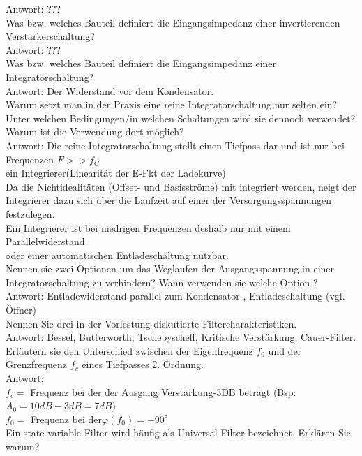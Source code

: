 \documentclass[A4]{scrartcl}
\begin{document}
  \bigskip Antwort: ???\\
  Was bzw. welches Bauteil definiert die Eingangsimpedanz einer invertierenden Verstärkerschaltung?\\
  \bigskip Antwort: ???\\
  Was bzw. welches Bauteil definiert die Eingangsimpedanz einer Integratorschaltung?\\
  \bigskip Antwort: Der Widerstand vor dem Kondensator.\\
  Warum setzt man in der Praxis eine reine Integratorschaltung nur selten ein? Unter welchen Bedingungen/in welchen Schaltungen wird sie dennoch verwendet? 
  Warum ist die Verwendung dort möglich?\\
  Antwort: Die reine Integratorschaltung stellt einen Tiefpass dar und ist nur bei Frequenzen $F >> f_C$\\
  ein Integrierer(Linearität der E-Fkt der Ladekurve)\\
  Da die Nichtidealitäten (Offset- und Basisströme) mit integriert werden, neigt der Integrierer dazu sich über die Laufzeit auf einer der Versorgungsspannungen festzulegen.\\
  Ein Integrierer ist bei niedrigen Frequenzen deshalb nur mit einem Parallelwiderstand\\
  \bigskip oder einer automatischen Entladeschaltung nutzbar.\\
  Nennen sie zwei Optionen um das Weglaufen der Ausgangsspannung in einer Integratorschaltung zu verhindern? Wann verwenden sie welche Option ?\\
  \bigskip Antwort: Entladewiderstand parallel zum Kondensator , Entladeschaltung (vgl. Öffner)\\
  Nennen Sie drei in der Vorlestung diskutierte Filtercharakteristiken.\\
  \bigskip Antwort: Bessel, Butterworth, Tschebyscheff, Kritische Verstärkung, Cauer-Filter.\\
  Erläutern sie den Unterschied zwischen der Eigenfrequenz $f_0$ und der Grenzfrequenz $f_c$ eines Tiefpasses 2. Ordnung.\\
  Antwort:\\
  $f_c = $ Frequenz bei der der Ausgang Verstärkung-3DB beträgt (Bsp: $A_0 = 10dB - 3dB = 7dB $)\\
  \bigskip $f_0 = $ Frequenz bei der$\varphi(f_0) = -90^\circ$\\
  Ein state-variable-Filter wird häufig als Universal-Filter bezeichnet. Erklären Sie warum?\\
\end{document}
